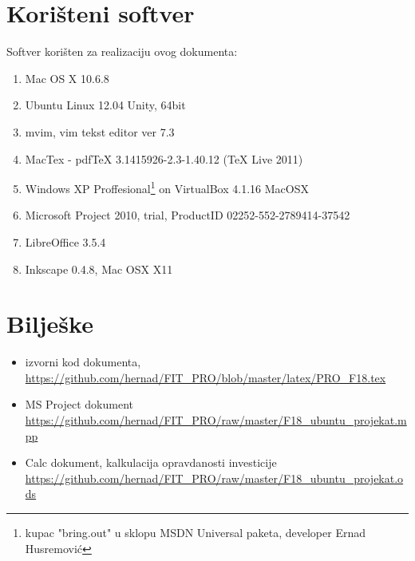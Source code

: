 \documentclass[times, utf8, seminar]{fit}
\begin{document}
\chapter{Korišteni softver}
Softver korišten za realizaciju ovog dokumenta:
\begin{enumerate}
  \item Mac OS X 10.6.8
  \item Ubuntu Linux 12.04 Unity, 64bit
  \item mvim, vim tekst editor ver 7.3
  \item MacTex - pdfTeX 3.1415926-2.3-1.40.12 (TeX Live 2011)
  \item Windows XP Proffesional\footnote{kupac "bring.out" u sklopu MSDN Universal paketa, developer Ernad Husremović} on VirtualBox 4.1.16 MacOSX 
  \item Microsoft Project 2010, trial, ProductID 02252-552-2789414-37542
  \item LibreOffice 3.5.4
  \item Inkscape 0.4.8, Mac OSX X11
\end{enumerate}

\chapter{Bilješke}
\label{chap:biljeske}

\begin{itemize}
  \item izvorni kod dokumenta, \url{https://github.com/hernad/FIT_PRO/blob/master/latex/PRO_F18.tex}
  \item MS Project dokument \url{https://github.com/hernad/FIT_PRO/raw/master/F18_ubuntu_projekat.mpp}
  \item Calc dokument, kalkulacija opravdanosti investicije \url{https://github.com/hernad/FIT_PRO/raw/master/F18_ubuntu_projekat.ods}
\end{itemize}
\end{document}
